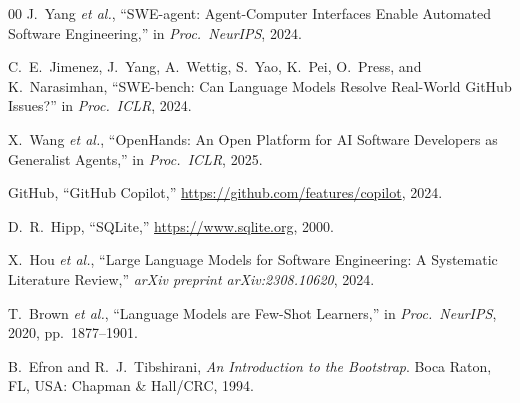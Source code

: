 \documentclass[journal]{IEEEtran}
\begin{document}
\begin{thebibliography}{00}
J.~Yang \emph{et al.}, ``SWE-agent: Agent-Computer Interfaces
Enable Automated Software Engineering,'' in \emph{Proc.\
NeurIPS}, 2024.

C.~E.~Jimenez, J.~Yang, A.~Wettig, S.~Yao, K.~Pei, O.~Press, and
K.~Narasimhan, ``SWE-bench: Can Language Models Resolve
Real-World GitHub Issues?'' in \emph{Proc.\ ICLR}, 2024.

X.~Wang \emph{et al.}, ``OpenHands: An Open Platform for AI
Software Developers as Generalist Agents,'' in \emph{Proc.\
ICLR}, 2025.

GitHub, ``GitHub Copilot,''
\url{https://github.com/features/copilot}, 2024.

D.~R.~Hipp, ``SQLite,''
\url{https://www.sqlite.org}, 2000.

X.~Hou \emph{et al.}, ``Large Language Models for Software
Engineering: A Systematic Literature Review,''
\emph{arXiv preprint arXiv:2308.10620}, 2024.

T.~Brown \emph{et al.}, ``Language Models are Few-Shot
Learners,'' in \emph{Proc.\ NeurIPS}, 2020,
pp.\ 1877--1901.

B.~Efron and R.~J.~Tibshirani, \emph{An Introduction to the
Bootstrap}. Boca Raton, FL, USA: Chapman \& Hall/CRC, 1994.

\end{thebibliography}
\end{document}
